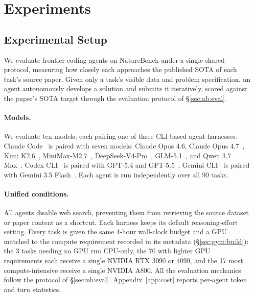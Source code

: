 \section{Experiments}
\label{sec:exp}

\subsection{Experimental Setup}
\label{sec:exp:setup}

We evaluate frontier coding agents on NatureBench under a single shared protocol, measuring how closely each approaches the published SOTA of each task's source paper. Given only a task's visible data and problem specification, an agent autonomously develops a solution and submits it iteratively, scored against the paper's SOTA target through the evaluation protocol of \S\ref{sec:nb:eval}.

\paragraph{Models.}
We evaluate ten models, each pairing one of three CLI-based agent harnesses. Claude Code~\citep{anthropic2025claudecode} is paired with seven models: Claude Opus 4.6, Claude Opus 4.7~\citep{anthropic2026opus46,anthropic2026opus47}, Kimi K2.6~\citep{moonshot2026kimik2}, MiniMax-M2.7~\citep{minimax2026m27}, DeepSeek-V4-Pro~\citep{deepseek2026v4}, GLM-5.1~\citep{zai2026glm51}, and Qwen 3.7 Max~\citep{qwen2026max}. Codex CLI~\citep{openai2025codex} is paired with GPT-5.4 and GPT-5.5~\citep{openai2026gpt54,openai2026gpt55}. Gemini CLI~\citep{google2025geminicli} is paired with Gemini 3.5 Flash~\citep{google2026gemini35flash}. Each agent is run independently over all 90 tasks.

\paragraph{Unified conditions.}
All agents disable web search, preventing them from retrieving the source dataset or paper content as a shortcut. Each harness keeps its default reasoning-effort setting. Every task is given the same 4-hour wall-clock budget and a GPU matched to the compute requirement recorded in its metadata (\S\ref{sec:gym:build}): the 3 tasks needing no GPU run CPU-only, the 70 with lighter GPU requirements each receive a single NVIDIA RTX 3090 or 4090, and the 17 most compute-intensive receive a single NVIDIA A800. All the evaluation mechanics follow the protocol of \S\ref{sec:nb:eval}. Appendix~\ref{app:cost} reports per-agent token and turn statistics.

